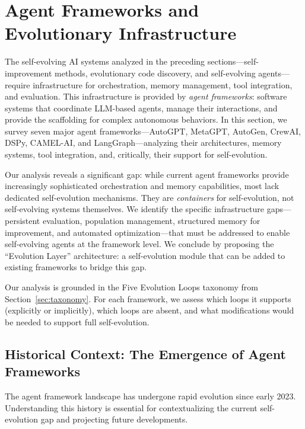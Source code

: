 
\section{Agent Frameworks and Evolutionary Infrastructure}
\label{sec:frameworks}

The self-evolving AI systems analyzed in the preceding sections---self-improvement methods, evolutionary code discovery, and self-evolving agents---require infrastructure for orchestration, memory management, tool integration, and evaluation. This infrastructure is provided by \emph{agent frameworks}: software systems that coordinate LLM-based agents, manage their interactions, and provide the scaffolding for complex autonomous behaviors. In this section, we survey seven major agent frameworks---AutoGPT, MetaGPT, AutoGen, CrewAI, DSPy, CAMEL-AI, and LangGraph---analyzing their architectures, memory systems, tool integration, and, critically, their support for self-evolution.

Our analysis reveals a significant gap: while current agent frameworks provide increasingly sophisticated orchestration and memory capabilities, most lack dedicated self-evolution mechanisms. They are \emph{containers} for self-evolution, not self-evolving systems themselves. We identify the specific infrastructure gaps---persistent evaluation, population management, structured memory for improvement, and automated optimization---that must be addressed to enable self-evolving agents at the framework level. We conclude by proposing the ``Evolution Layer'' architecture: a self-evolution module that can be added to existing frameworks to bridge this gap.

Our analysis is grounded in the Five Evolution Loops taxonomy from Section~\ref{sec:taxonomy}. For each framework, we assess which loops it supports (explicitly or implicitly), which loops are absent, and what modifications would be needed to support full self-evolution.


\subsection{Historical Context: The Emergence of Agent Frameworks}

The agent framework landscape has undergone rapid evolution since early 2023. Understanding this history is essential for contextualizing the current self-evolution gap and projecting future developments.


